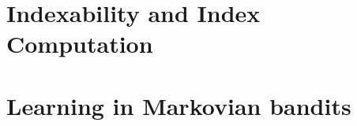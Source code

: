 \documentclass[%
    paper=A4,              %
    twoside=true,          %
    openright,             %
    parskip=half,          %
    chapterprefix=true,    %
    11pt,                  %
    headings=normal,       %
    bibliography=totoc,    %
    listof=totoc,          %
    titlepage=on,          %
    captions=tableabove,   %
    chapterprefix=false,   %
    appendixprefix=false,  %
    draft=false,           %
]{scrreprt}
\newcommand{\KK}[1]{\todo[color=green!10,author=\textbf{\small KK},inline]{\small #1\\}}
\begin{document}
\iftotalcompilation
\part{Indexability and Index Computation}
\label{part:idx}




\cleardoublepage %
\clearpage
\fi



\iftotalcompilation
\part{Learning in Markovian bandits}
\label{part:learning}
\end{document}
